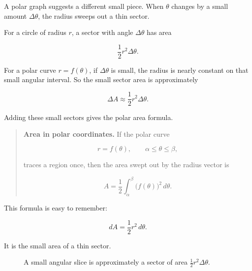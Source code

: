 A polar graph suggests a different small piece.  When \(\theta\) changes by a small amount
\(\Delta\theta\), the radius sweeps out a thin sector.

For a circle of radius \(r\), a sector with angle \(\Delta\theta\) has area

\[
\frac12 r^2\Delta\theta.
\]

For a polar curve \(r=f(\theta)\), if \(\Delta\theta\) is small, the radius is nearly constant
on that small angular interval.  So the small sector area is approximately

\[
\Delta A\approx \frac12 r^2\Delta\theta.
\]

Adding these small sectors gives the polar area formula.

\begin{quote}
\textbf{Area in polar coordinates.}
If the polar curve

\[
r=f(\theta),
\qquad
\alpha\le\theta\le\beta,
\]

traces a region once, then the area swept out by the radius vector is

\[
\boxed{
A=\frac12\int_\alpha^\beta \bigl(f(\theta)\bigr)^2\,d\theta.
}
\]
\end{quote}

This formula is easy to remember:

\[
\boxed{
dA=\frac12r^2\,d\theta.
}
\]

It is the small area of a thin sector.

\begin{figure}[h]
\centering
{}
\caption{A small angular slice is approximately a sector of area \(\frac12r^2\Delta\theta\).}
\label{fig:polar-sector-area}
\end{figure}

